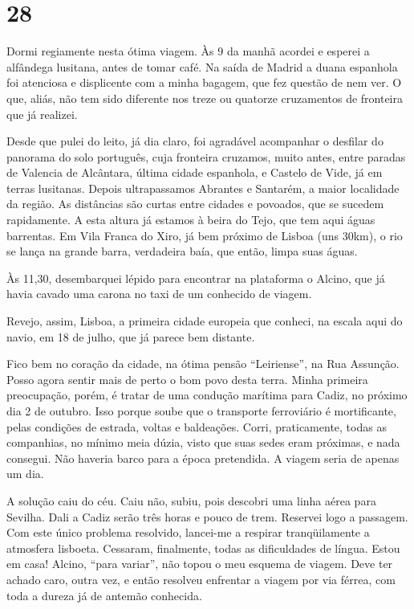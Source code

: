 \section*{28 \adfflatleafright {}}
Dormi regiamente nesta ótima viagem. Às 9 da manhã acordei e esperei a alfândega lusitana, antes de tomar café. Na saída de Madrid a duana espanhola foi atenciosa e displicente com a minha bagagem, que fez questão de nem ver. O que, aliás, não tem sido diferente nos treze ou quatorze cruzamentos de fronteira que já realizei.

Desde que pulei do leito, já dia claro, foi agradável acompanhar o desfilar do panorama do solo português, cuja fronteira cruzamos, muito antes, entre paradas de Valencia de Alcântara, última cidade espanhola, e Castelo de Vide, já em terras lusitanas. Depois ultrapassamos Abrantes e Santarém, a maior localidade da região. As distâncias são curtas entre cidades e povoados, que se sucedem rapidamente. A esta altura já estamos à beira do Tejo, que tem aqui águas barrentas. Em Vila Franca do Xiro, já bem próximo de Lisboa (uns 30km), o rio se lança na grande barra, verdadeira baía, que então, limpa suas águas.

Às 11,30, desembarquei lépido para encontrar na plataforma o Alcino, que já havia cavado uma carona no taxi de um conhecido de viagem.

Revejo, assim, Lisboa, a primeira cidade europeia que conheci, na escala aqui do navio, em 18 de julho, que já parece bem distante.

Fico bem no coração da cidade, na ótima pensão ``Leiriense'', na Rua Assunção. Posso agora sentir mais de perto o bom povo desta terra. Minha primeira preocupação, porém, é tratar de uma condução marítima para Cadiz, no próximo dia 2 de outubro. Isso porque soube que o transporte ferroviário é mortificante, pelas condições de estrada, voltas e baldeações. Corri, praticamente, todas as companhias, no mínimo meia dúzia, visto que suas sedes eram próximas, e nada consegui. Não haveria barco para a época pretendida. A viagem seria de apenas um dia.

A solução caiu do céu. Caiu não, subiu, pois descobri uma linha aérea para Sevilha. Dali a Cadiz serão três horas e pouco de trem. Reservei logo a passagem. Com este único problema resolvido, lancei-me a respirar tranqüilamente a atmosfera lisboeta. Cessaram, finalmente, todas as dificuldades de língua. Estou em casa! Alcino, ``para variar'', não topou o meu esquema de viagem. Deve ter achado caro, outra vez, e então resolveu enfrentar a viagem por via férrea, com toda a dureza já de antemão conhecida.


